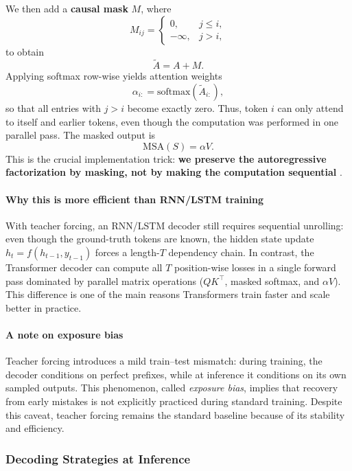 \noindent
We then add a \textbf{causal mask} \(M\),
where
\[
M_{ij} =
\begin{cases}
	0, & j \le i,\\
	-\infty, & j > i,
\end{cases}
\]
to obtain
\[
\tilde{A} = A + M.
\]
Applying softmax row-wise yields attention weights
\[
\alpha_{i:} = \text{softmax}(\tilde{A}_{i:}),
\]
so that all entries with \(j > i\) become exactly zero.
Thus, token \(i\) can only attend to itself and earlier tokens,
even though the computation was performed in one parallel pass.
The masked output is
\[
\text{MSA}(S) = \alpha V.
\]
This is the crucial implementation trick:
\textbf{we preserve the autoregressive factorization by masking,
	not by making the computation sequential} \cite{vaswani2017_attention}.

\paragraph{Why this is more efficient than RNN/LSTM training}
\noindent
With teacher forcing, an RNN/LSTM decoder still requires sequential unrolling:
even though the ground-truth tokens are known,
the hidden state update \(h_t = f(h_{t-1}, y_{t-1})\) forces a length-\(T\) dependency chain.
In contrast, the Transformer decoder can compute all \(T\) position-wise losses
in a single forward pass dominated by parallel matrix operations
(\(QK^\top\), masked softmax, and \(\alpha V\)).
This difference is one of the main reasons Transformers train faster and scale better in practice.

\paragraph{A note on exposure bias}
\noindent
Teacher forcing introduces a mild train--test mismatch:
during training, the decoder conditions on perfect prefixes,
while at inference it conditions on its own sampled outputs.
This phenomenon, called \emph{exposure bias},
implies that recovery from early mistakes is not explicitly practiced during standard training.
Despite this caveat, teacher forcing remains the standard baseline
because of its stability and efficiency.

\subsubsection{Decoding Strategies at Inference}
\label{subsubsec:chapter17_decoding_strategies}

